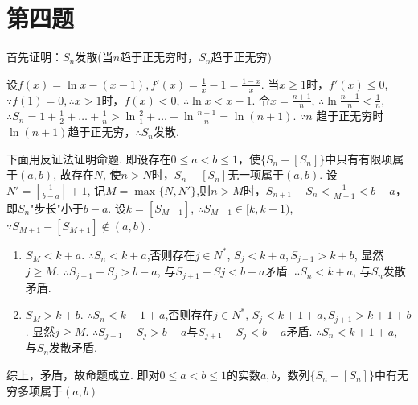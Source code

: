 \section{第四题}
首先证明：$S_n$发散(当$n$趋于正无穷时，$S_n$趋于正无穷) \par
设$f(x) = \ln x - (x-1), f'(x) = \frac{1}{x} - 1 = \frac{1-x}{x}$.
当$x \ge 1$时，$f'(x) \le 0$, $\because f(1) = 0, \therefore x > 1$时，$f(x) < 0$,
$\therefore \ln x < x-1$.  令$x = \frac{n+1}{n}$, $\therefore \ln \frac{n+1}{n} < \frac{1}{n}$,
$\therefore S_n=1+\frac{1}{2}+ \ldots + \frac{1}{n} > \ln \frac{2}{1} + \ldots + \ln \frac{n+1}{n} = \ln(n+1)$.
$\because n$ 趋于正无穷时 $\ln (n+1)$趋于正无穷，$\therefore S_n$发散. \par
下面用反证法证明命题. 
即设存在$0 \le a < b \le 1$，使$\{ S_n - [S_n] \}$中只有有限项属于$(a, b)$,
故存在$N$, 使$n > N$时，$S_n - [S_n]$无一项属于$(a, b)$. 设$N' = [\frac{1}{b-a}] + 1$,
记$M = \max \{ N, N' \}$,则$n > M$时，$S_{n+1} - S_n < \frac{1}{M+1} < b-a$，即$S_n$"步长"小于$b-a$.
设$k = [S_{M+1}]$, $\therefore S_{M+1} \in [k, k+1)$, $ \because S_{M+1}-[S_{M+1}] \not \in (a, b)$. \par
\begin{enumerate}
	\item $S_M < k+a$. $\therefore S_n < k+a$,否则存在$j \in N^*$, $S_j < k+a, S_{j+1} > k+b$, 
		显然$j \ge M$. $\therefore S_{j+1} - S_j > b-a$, 与$S_{j+1} - S{j} < b-a$矛盾. $\therefore S_n < k+a$,
		与$S_n$发散矛盾.
	\item $S_M > k+b$. $\therefore S_n < k+1+a$,否则存在$j \in N^*$, $S_j < k+1+a, S_{j+1} > k+1+b$.
		显然$j \ge M$. $\therefore S_{j+1}-S_j > b-a$与$S_{j+1}-S_j < b-a$矛盾. $\therefore S_n <k+1+a$,
		与$S_n$发散矛盾.
\end{enumerate}

综上，矛盾，故命题成立. 即对$0 \le a < b \le 1$的实数$a,b$，数列$\{ S_n-[S_n] \}$中有无穷多项属于$(a,b)$
